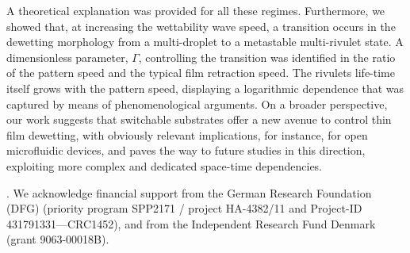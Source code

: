 \documentclass[twocolumn,amsmath,amssymb,showpacs,prl,superscriptaddress]{revtex4-1} %
\begin{document}
A theoretical explanation was provided for all these regimes.
Furthermore, we showed that, at increasing the wettability wave speed, a transition occurs in the dewetting morphology from a multi-droplet to a metastable multi-rivulet state. 
A dimensionless parameter, $\Gamma$, controlling the transition was identified in the ratio of the pattern speed and the typical film retraction speed. 
The rivulets life-time itself grows with the pattern speed, displaying a logarithmic dependence that was captured by means of phenomenological arguments.
On a broader perspective, our work suggests that switchable substrates offer a new avenue to control thin film dewetting, with obviously relevant implications, for instance, for open microfluidic devices, and paves the way to future studies in this direction, exploiting more complex and dedicated space-time dependencies.

. We acknowledge financial support from the German Research Foundation (DFG) (priority program SPP2171 / project HA-4382/11 and Project-ID 431791331—CRC1452), and from the Independent Research Fund Denmark (grant 9063-00018B). 


\end{document}
